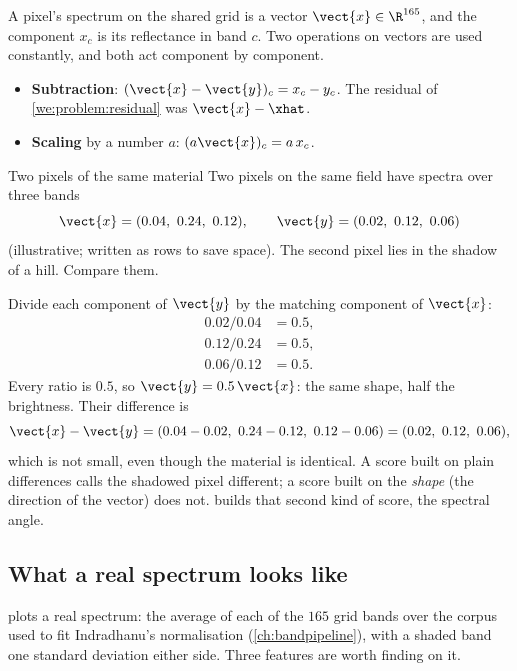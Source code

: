 A pixel's spectrum on the shared grid is a vector $\vect{x} \in \R^{165}$, and the component
$x_c$ is its reflectance in band $c$. Two operations on vectors are used constantly, and both act
component by component.

\begin{itemize}
\item \textbf{Subtraction}: $(\vect{x} - \vect{y})_c = x_c - y_c$. The residual of
\cref{we:problem:residual} was $\vect{x} - \xhat$.
\item \textbf{Scaling} by a number $a$: $(a\vect{x})_c = a\,x_c$.
\end{itemize}

\begin{worked}[label={we:light:vector}]{Two pixels of the same material}
Two pixels on the same field have spectra over three bands
\[ \vect{x} = (0.04,\ 0.24,\ 0.12), \qquad \vect{y} = (0.02,\ 0.12,\ 0.06) \]
(illustrative\tagA; written as rows to save space). The second pixel lies in the shadow of a
hill. Compare them.

Divide each component of $\vect{y}$ by the matching component of $\vect{x}$:
\begin{align*}
0.02/0.04 &= 0.5,\\
0.12/0.24 &= 0.5,\\
0.06/0.12 &= 0.5.
\end{align*}
Every ratio is $0.5$, so $\vect{y} = 0.5\,\vect{x}$: the same shape, half the brightness. Their
difference is
\[ \vect{x} - \vect{y} = (0.04 - 0.02,\ 0.24 - 0.12,\ 0.12 - 0.06) = (0.02,\ 0.12,\ 0.06), \]
which is not small, even though the material is identical. A score built on plain differences
calls the shadowed pixel different; a score built on the \emph{shape} (the direction of the
vector) does not.  builds that second kind of score, the spectral angle.
\end{worked}

\subsection{What a real spectrum looks like}

 plots a real spectrum: the average of each of the $165$ grid bands
over the corpus used to fit Indradhanu's normalisation (\cref{ch:bandpipeline}), with a shaded
band one standard deviation either side. Three features are worth finding on it.

